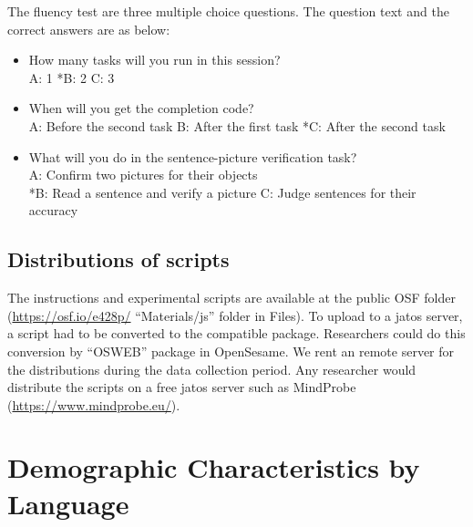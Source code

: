 \documentclass[
  man,floatsintext]{apa7}
\begin{document}
The fluency test are three multiple choice questions. The question text and the correct answers are as below:

\begin{itemize}
\item
  How many tasks will you run in this session?\\
  A: 1
  *B: 2
  C: 3
\item
  When will you get the completion code?\\
  A: Before the second task
  B: After the first task
  *C: After the second task
\item
  What will you do in the sentence-picture verification task?\\
  A: Confirm two pictures for their objects\\
  *B: Read a sentence and verify a picture
  C: Judge sentences for their accuracy
\end{itemize}

\hypertarget{distributions-of-scripts}{%
\subsection{Distributions of scripts}\label{distributions-of-scripts}}

The instructions and experimental scripts are available at the public OSF folder (\url{https://osf.io/e428p/} ``Materials/js'' folder in Files). To upload to a jatos server, a script had to be converted to the compatible package. Researchers could do this conversion by ``OSWEB'' package in OpenSesame. We rent an remote server for the distributions during the data collection period. Any researcher would distribute the scripts on a free jatos server such as MindProbe (\url{https://www.mindprobe.eu/}).

\hypertarget{demographic-characteristics-by-language}{%
\section{Demographic Characteristics by Language}\label{demographic-characteristics-by-language}}
\end{document}
